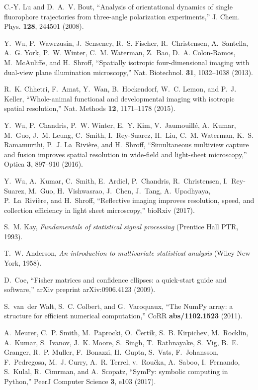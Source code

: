 \documentclass[10pt]{article}
\begin{document}
\begin{thebibliography}{10}
C.-Y. Lu and D.~A.~V. Bout, \enquote{Analysis of orientational dynamics of
  single fluorophore trajectories from three-angle polarization experiments,}
  J. Chem. Phys. \textbf{128}, 244501 (2008).

Y.~Wu, P.~Wawrzusin, J.~Senseney, R.~S. Fischer, R.~Christensen, A.~Santella,
  A.~G. York, P.~W. Winter, C.~M. Waterman, Z.~Bao, D.~A. Colon-Ramos,
  M.~McAuliffe, and H.~Shroff, \enquote{Spatially isotropic four-dimensional
  imaging with dual-view plane illumination microscopy,} Nat. Biotechnol.
  \textbf{31}, 1032--1038 (2013).

R.~K. Chhetri, F.~Amat, Y.~Wan, B.~Hockendorf, W.~C. Lemon, and P.~J. Keller,
  \enquote{Whole-animal functional and developmental imaging with isotropic
  spatial resolution,} Nat. Methods \textbf{12}, 1171--1178 (2015).

Y.~Wu, P.~Chandris, P.~W. Winter, E.~Y. Kim, V.~Jaumouill{\'e}, A.~Kumar,
  M.~Guo, J.~M. Leung, C.~Smith, I.~Rey-Suarez, H.~Liu, C.~M. Waterman, K.~S.
  Ramamurthi, P.~J. La~Rivi\`ere, and H.~Shroff, \enquote{Simultaneous
  multiview capture and fusion improves spatial resolution in wide-field and
  light-sheet microscopy,} Optica \textbf{3}, 897--910 (2016).

Y.~Wu, A.~Kumar, C.~Smith, E.~Ardiel, P.~Chandris, R.~Christensen,
  I.~Rey-Suarez, M.~Guo, H.~Vishwasrao, J.~Chen, J.~Tang, A.~Upadhyaya,
  P.~La~Rivi\`ere, and H.~Shroff, \enquote{Reflective imaging improves
  resolution, speed, and collection efficiency in light sheet microscopy,}
  bioRxiv  (2017).

S.~M. Kay, \emph{Fundamentals of statistical signal processing} (Prentice Hall
  PTR, 1993).

T.~W. Anderson, \emph{An introduction to multivariate statistical analysis}
  (Wiley New York, 1958).

D.~Coe, \enquote{Fisher matrices and confidence ellipses: a quick-start guide
  and software,} arXiv preprint arXiv:0906.4123  (2009).

S.~van~der Walt, S.~C. Colbert, and G.~Varoquaux, \enquote{The {N}um{P}y array:
  a structure for efficient numerical computation,} CoRR \textbf{abs/1102.1523}
  (2011).

A.~Meurer, C.~P. Smith, M.~Paprocki, O.~\v{C}ert\'{i}k, S.~B. Kirpichev,
  M.~Rocklin, A.~Kumar, S.~Ivanov, J.~K. Moore, S.~Singh, T.~Rathnayake,
  S.~Vig, B.~E. Granger, R.~P. Muller, F.~Bonazzi, H.~Gupta, S.~Vats,
  F.~Johansson, F.~Pedregosa, M.~J. Curry, A.~R. Terrel, v.~Rou\v{c}ka,
  A.~Saboo, I.~Fernando, S.~Kulal, R.~Cimrman, and A.~Scopatz,
  \enquote{Sym{P}y: symbolic computing in {P}ython,} PeerJ Computer Science
  \textbf{3}, e103 (2017).


\end{thebibliography}
\end{document}
